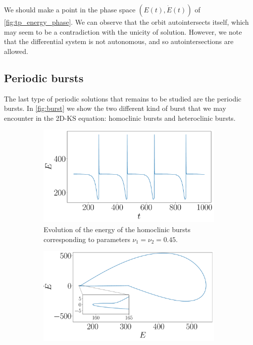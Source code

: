 \documentclass[twoside]{article}
\begin{document}
We should make a point in the phase space $(E(t), \dot{E}(t))$ of \cref{fig:tp_energy_phase}. We can observe that the orbit autointersects itself, which may seem to be a contradiction with the unicity of solution. However, we note that the differential system is not autonomous, and so autointersections are allowed.
\subsection{Periodic bursts}\label{sec:periodic_bursts}
The last type of periodic solutions that remains to be studied are the periodic bursts. In \cref{fig:burst} we show the two different kind of burst that we may encounter in the 2D-KS equation: homoclinic bursts and heteroclinic bursts.

\begin{figure}[ht]
  \centering
  \begin{subfigure}[ht]{0.45\textwidth}
    \includegraphics[width=\textwidth]{images/homo_burst.pdf}
    \caption{Evolution of the energy of the homoclinic bursts corresponding to parameters $\nu_1=\nu_2=0.45$.}
  \end{subfigure}\hfill
  \begin{subfigure}[ht]{0.45\textwidth}
    \includegraphics[width=\textwidth]{images/homo_burst_phase.pdf}

\end{subfigure}
\end{figure}
\end{document}
